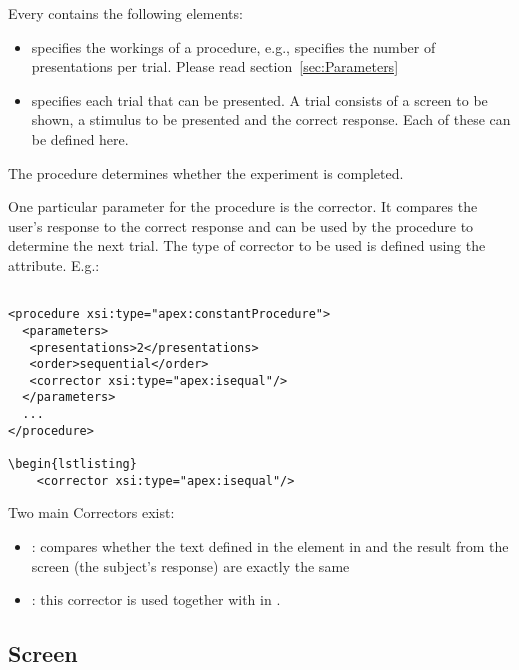 Every  contains the following elements:

\begin{itemize}
\item {} specifies the workings of a procedure,
e.g., specifies the number of presentations per trial. Please read
section~\ref{sec:Parameters} 

\item {} specifies each
trial that can be presented. A trial consists of a screen to be
shown, a stimulus to be presented and the correct response. Each
of these can be defined here.
\end{itemize}

The procedure determines whether the experiment is completed.

One particular parameter for the procedure is the corrector. It compares the user's response to the correct response and can be used by the procedure to determine the next trial. The type of corrector to be used is defined using the  attribute. E.g.:

\begin{lstlisting}

<procedure xsi:type="apex:constantProcedure">
  <parameters>
   <presentations>2</presentations>
   <order>sequential</order>
   <corrector xsi:type="apex:isequal"/>
  </parameters>
  ...
</procedure>

\begin{lstlisting}
    <corrector xsi:type="apex:isequal"/>
\end{lstlisting}

Two main Correctors exist:
\begin{itemize}\item {}: compares whether the text defined in the  element in
 and the result from the screen (the subject's response) are exactly the same

\item {}: this corrector is used together with
 in . 
\end{itemize}

\label{sec:Corrector}

\subsection{Screen}
\label{sec:screen}

